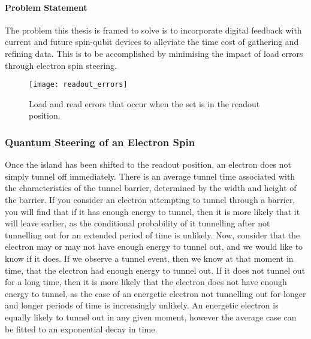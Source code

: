 		\paragraph{Problem Statement}
		\label{sec::problem_statement}
%		
		The problem this thesis is framed to solve is to incorporate digital feedback with current and future spin-qubit devices to alleviate the time cost of gathering and refining data. This is to be accomplished by minimising the impact of load errors through electron spin steering.
		
		\begin{figure}[htbp!]
			\centering
			\texttt{[image: readout\_errors]}
			\caption[Load and red errors in the \gls{set} readout position]{Load and read errors that occur when the \gls{set} is in the readout position.\cite{electron_spin_silicon}}
			\label{fig::errors}
		\end{figure}
		
	\subsubsection{Quantum Steering of an Electron Spin}
	
		Once the island has been shifted to the readout position, an electron does not simply tunnel off immediately. There is an average tunnel time associated with the characteristics of the tunnel barrier, determined by the width and height of the 	barrier. If you consider an electron attempting to tunnel through a barrier, you will find that if it has enough energy to tunnel, then it is more likely that it will leave earlier, as the conditional probability of it tunnelling after not tunnelling out for an extended period of time is unlikely. Now, consider that the electron may or may not have enough energy to tunnel out, and we would like to know if it does. If we observe a tunnel event, then we know at that moment in time, that the electron had enough energy to tunnel out. If it does not tunnel out for a long time, then it is more likely that the electron does not have enough energy to tunnel, as the case of an energetic electron not tunnelling out for longer and longer periods of time is increasingly unlikely. An energetic electron is equally likely to tunnel out in any given moment, however the average case can be fitted to an exponential decay in time.
		
